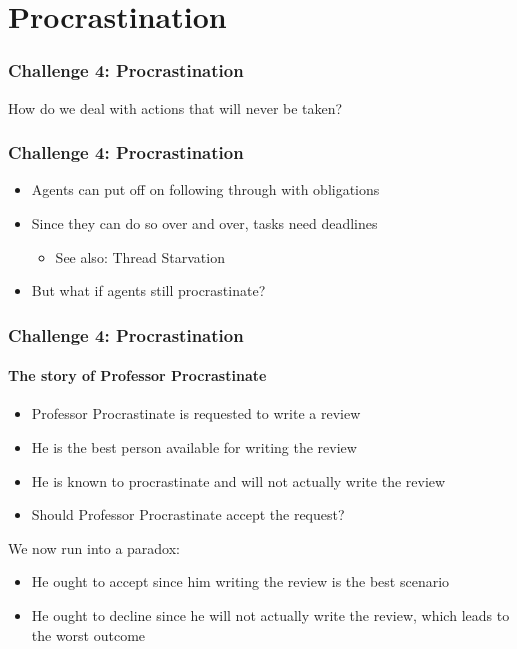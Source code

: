 \documentclass[usenames,dvipsnames]{beamer}
\begin{document}
    \section{Procrastination}
	\begin{frame}
		\frametitle{Challenge 4: Procrastination}
	
		How do we deal with actions that will never be taken?
	
	\end{frame}

	\begin{frame}
		\frametitle{Challenge 4: Procrastination}
	
		\begin{itemize}
			\item Agents can put off on following through with obligations
			\item Since they can do so over and over, tasks need deadlines
			\begin{itemize}
				\item See also: Thread Starvation
			\end{itemize}
			\item But what if agents still procrastinate?
		\end{itemize}
	
	\end{frame}

	\begin{frame}
		\frametitle{Challenge 4: Procrastination}
		\framesubtitle{The story of Professor Procrastinate}

		\begin{itemize}
			\item Professor Procrastinate is requested to write a review
			\item He is the best person available for writing the review
			\item He is known to procrastinate and will not actually write the review
			\item Should Professor Procrastinate accept the request?
		\end{itemize}\pause

		We now run into a paradox:\pause
		\begin{itemize}
			\item He ought to accept since him writing the review is the best scenario\pause
			\item He ought to decline since he will not actually write the review, which leads to the worst outcome
		\end{itemize}
	\end{frame}
\end{document}
